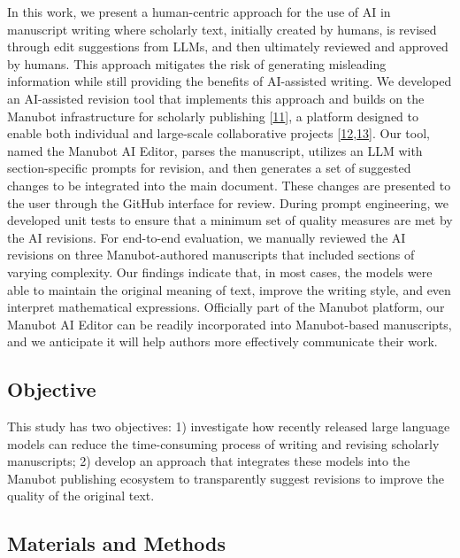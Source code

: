 \documentclass[
]{article}
\begin{document}
In this work, we present a human-centric approach for the use of AI in manuscript writing where scholarly text, initially created by humans, is revised through edit suggestions from LLMs, and then ultimately reviewed and approved by humans.
This approach mitigates the risk of generating misleading information while still providing the benefits of AI-assisted writing.
We developed an AI-assisted revision tool that implements this approach and builds on the Manubot infrastructure for scholarly publishing {[}\protect\hyperlink{ref-YuJbg3zO}{11}{]}, a platform designed to enable both individual and large-scale collaborative projects {[}\protect\hyperlink{ref-PZMP42Ak}{12},\protect\hyperlink{ref-10gsAq0o}{13}{]}.
Our tool, named the Manubot AI Editor, parses the manuscript, utilizes an LLM with section-specific prompts for revision, and then generates a set of suggested changes to be integrated into the main document.
These changes are presented to the user through the GitHub interface for review.
During prompt engineering, we developed unit tests to ensure that a minimum set of quality measures are met by the AI revisions.
For end-to-end evaluation, we manually reviewed the AI revisions on three Manubot-authored manuscripts that included sections of varying complexity.
Our findings indicate that, in most cases, the models were able to maintain the original meaning of text, improve the writing style, and even interpret mathematical expressions.
Officially part of the Manubot platform, our Manubot AI Editor can be readily incorporated into Manubot-based manuscripts, and we anticipate it will help authors more effectively communicate their work.

\hypertarget{objective}{%
\subsection{Objective}\label{objective}}

This study has two objectives:
1) investigate how recently released large language models can reduce the time-consuming process of writing and revising scholarly manuscripts;
2) develop an approach that integrates these models into the Manubot publishing ecosystem to transparently suggest revisions to improve the quality of the original text.

\hypertarget{materials-and-methods}{%
\subsection{Materials and Methods}\label{materials-and-methods}}
\end{document}
